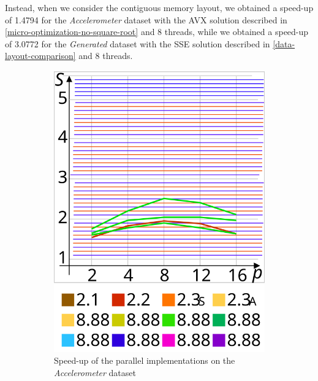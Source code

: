 \documentclass{article}
\begin{document}
Instead, when we consider the contiguous memory layout, we obtained a speed-up of 1.4794 for the
\textit{Accelerometer} dataset with the AVX solution described in
\ref{micro-optimization-no-square-root} and 8 threads, while we obtained a speed-up of 3.0772 for
the \textit{Generated} dataset with the SSE solution described in \ref{data-layout-comparison}
and 8 threads.



\begin{figure}[H]
\centering
\begin{subfigure}{.47\linewidth}
\includegraphics[width=\linewidth]{speed-up-1}
\caption*{Speed-up of the parallel implementations on the \textit{Accelerometer} dataset}
\end{subfigure}%
\hspace{3mm}%
\begin{subfigure}{.47\linewidth}

\end{subfigure}
\end{figure}
\end{document}
